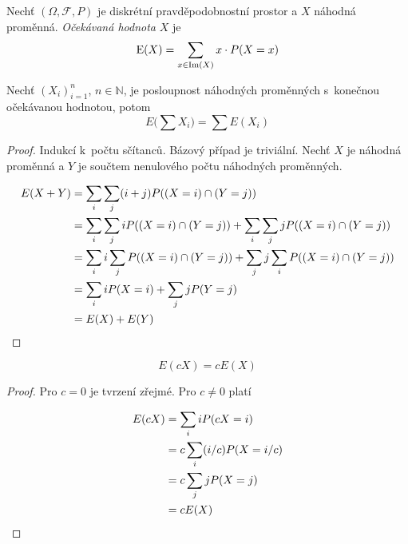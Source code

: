 \begin{definition}
    Nechť $(\Omega, \mathcal{F}, P)$ je diskrétní pravděpodobnostní
    prostor a $X$ náhodná proměnná. {\em Očekávaná hodnota} $X$
    je
    \[ \operatorname{E}(X) = \sum_{x \in \operatorname{Im}(X)} x \cdot P(X = x) \]
\end{definition}

\begin{theorem}
    Nechť $(X_i)_{i=1}^{n}$, $n \in \mathbb{N}$, je posloupnost
    náhodných proměnných \linebreak s~konečnou očekávanou hodnotou, potom
    \[
        E \big ( \sum X_i \big ) = \sum E(X_i)
    \]
\end{theorem}

\begin{proof}
    Indukcí k~počtu sčítanců. Bázový případ je triviální. Nechť $X$ je
    náhodná proměnná a $Y$ je součtem nenulového počtu náhodných proměnných.

    \begin{align*}
        E(X + Y) &= \sum_i \sum_j (i+j) P((X = i) \cap (Y = j)) \\
                 &= \sum_i \sum_j i P((X = i) \cap (Y = j))
                  + \sum_i \sum_j j P((X = i) \cap (Y = j)) \\
                 &= \sum_i i \sum_j P((X = i) \cap (Y = j))
                  + \sum_j j \sum_i P((X = i) \cap (Y = j)) \\
                 &= \sum_i i P(X = i)
                  + \sum_j j P(Y = j) \\
                 &= E(X) + E(Y)
                   \qedhere
    \end{align*}
\end{proof}

\pagebreak

\begin{theorem}
    \[
        E(cX) = cE(X)
    \]
\end{theorem}

\begin{proof}
    Pro $c = 0$ je tvrzení zřejmé. Pro $c \neq 0$ platí

    \begin{align*}
        E(cX) &=   \sum_i i P(cX = i) \\
              &= c \sum_i (i/c) P(X = i/c) \\
              &= c \sum_j j P(X = j) \\
              &= c E(X)
                \qedhere
    \end{align*}
\end{proof}

